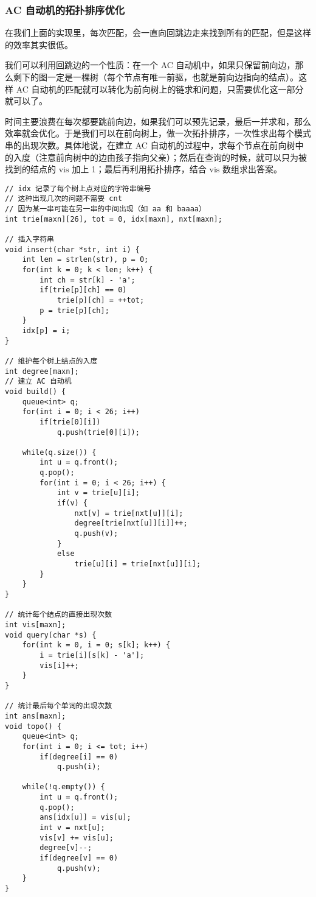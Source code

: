 \documentclass[UTF8]{article}
\begin{document}
\subsubsection{AC 自动机的拓扑排序优化}
在我们上面的实现里，每次匹配，会一直向回跳边走来找到所有的匹配，但是这样的效率其实很低。

我们可以利用回跳边的一个性质：在一个 AC 自动机中，如果只保留前向边，那么剩下的图一定是一棵树（每个节点有唯一前驱，也就是前向边指向的结点）。这样 AC 自动机的匹配就可以转化为前向树上的链求和问题，只需要优化这一部分就可以了。

时间主要浪费在每次都要跳前向边，如果我们可以预先记录，最后一并求和，那么效率就会优化。于是我们可以在前向树上，做一次拓扑排序，一次性求出每个模式串的出现次数。具体地说，在建立 AC 自动机的过程中，求每个节点在前向树中的入度（注意前向树中的边由孩子指向父亲）；然后在查询的时候，就可以只为被找到的结点的 $\mathrm{vis}$ 加上 1；最后再利用拓扑排序，结合 $\mathrm{vis}$ 数组求出答案。

\begin{lstlisting}[caption=AC 自动机的拓扑排序优化]
// idx 记录了每个树上点对应的字符串编号
// 这种出现几次的问题不需要 cnt
// 因为某一串可能在另一串的中间出现（如 aa 和 baaaa）
int trie[maxn][26], tot = 0, idx[maxn], nxt[maxn];

// 插入字符串
void insert(char *str, int i) {
	int len = strlen(str), p = 0;
	for(int k = 0; k < len; k++) {
		int ch = str[k] - 'a';
		if(trie[p][ch] == 0)
			trie[p][ch] = ++tot;
		p = trie[p][ch];
	}
	idx[p] = i;
}

// 维护每个树上结点的入度
int degree[maxn];
// 建立 AC 自动机
void build() {
    queue<int> q;
    for(int i = 0; i < 26; i++)
        if(trie[0][i])
            q.push(trie[0][i]);
    
    while(q.size()) {
        int u = q.front();
        q.pop();
        for(int i = 0; i < 26; i++) {
            int v = trie[u][i];
            if(v) {
                nxt[v] = trie[nxt[u]][i];
                degree[trie[nxt[u]][i]]++;
                q.push(v);
            }
            else
                trie[u][i] = trie[nxt[u]][i];
        }
    }
}

// 统计每个结点的直接出现次数
int vis[maxn];
void query(char *s) {
    for(int k = 0, i = 0; s[k]; k++) {
        i = trie[i][s[k] - 'a'];
        vis[i]++;
    }
}

// 统计最后每个单词的出现次数
int ans[maxn];
void topo() {
    queue<int> q;
    for(int i = 0; i <= tot; i++)
        if(degree[i] == 0)
            q.push(i);
    
    while(!q.empty()) {
        int u = q.front();
        q.pop();
        ans[idx[u]] = vis[u];
        int v = nxt[u];
        vis[v] += vis[u];
        degree[v]--;
        if(degree[v] == 0)
            q.push(v);
    }
}
\end{lstlisting}
\end{document}
